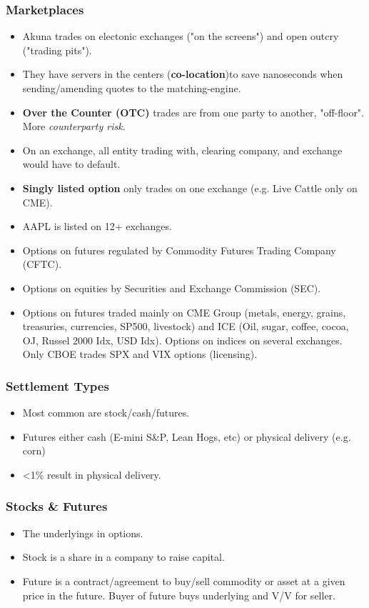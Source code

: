 \documentclass{article}
\begin{document}
\subsubsection{Marketplaces}
\begin{itemize}
    \item Akuna trades on electonic exchanges ("on the screens") and open outcry ("trading pits").
    \item They have servers in the centers (\textbf{co-location})to save nanoseconds when
sending/amending quotes to the matching-engine.
    \item \textbf{Over the Counter (OTC)} trades are from one party to another,
    "off-floor". More \textit{counterparty risk}.
    \item On an exchange, all entity trading with, clearing company, and exchange
    would have to default.
    \item \textbf{Singly listed option} only trades on one exchange
    (e.g. Live Cattle only on CME).
    \item AAPL is listed on 12+ exchanges.
    \item Options on futures regulated by Commodity Futures Trading Company (CFTC).
    \item Options on equities by Securities and Exchange Commission (SEC).
    \item Options on futures traded mainly on CME Group (metals, energy, grains,
    treasuries, currencies, SP500, livestock) and ICE (Oil, sugar, coffee,
    cocoa, OJ, Russel 2000 Idx, USD Idx). Options on indices on several exchanges.
    Only CBOE trades SPX and VIX options (licensing). 
\end{itemize}

\subsubsection{Settlement Types}
\begin{itemize}
    \item Most common are stock/cash/futures.
    \item Futures either cash (E-mini S\&P, Lean Hogs, etc) or physical delivery
    (e.g. corn)
    \item <1\% result in physical delivery.
\end{itemize}

\subsubsection{Stocks \& Futures}
\begin{itemize}
    \item The underlyings in options.
    \item Stock is a share in a company to raise capital.
    \item Future is a contract/agreement to buy/sell commodity or asset at a 
    given price in the future. Buyer of future buys underlying and V/V for seller.
\end{itemize}
\end{document}
